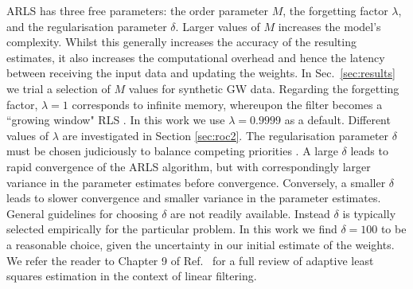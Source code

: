\documentclass[pra,superscriptaddress,reprint,amsmath,amssymb,nofootinbib]{revtex4-2}
\begin{document}
ARLS has three free parameters: the order parameter $M$, the forgetting factor $\lambda$, and the regularisation parameter $\delta$. Larger values of $M$ increases the model's complexity. Whilst this generally increases the accuracy of the resulting estimates, it also increases the computational overhead and hence the latency between receiving the input data and updating the weights. In Sec.~\ref{sec:results} we trial a selection of $M$ values for synthetic GW data. Regarding the forgetting factor,  $\lambda=1$ corresponds to infinite memory, whereupon the filter becomes a ``growing window" RLS \citep{10.5555/547203,10.5555/560138}. In this work we use $\lambda=0.9999$ as a default. Different values of $\lambda$ are investigated in Section \ref{sec:roc2}. The regularisation parameter $\delta$ must be chosen judiciously to balance competing priorities  \citep{ljung1999system,1989system}. A large $\delta$ leads to rapid convergence of the ARLS algorithm, but with correspondingly larger variance in the parameter estimates before convergence. Conversely, a smaller $\delta$ leads to slower convergence and smaller variance in the parameter estimates. General guidelines for choosing $\delta$ are not readily available. Instead $\delta$ is typically selected empirically for the particular problem. In this work we find $\delta = 100$ to be a reasonable choice, given the uncertainty in our initial estimate of the weights. We refer the reader to Chapter 9 of Ref.~\cite{HaykinAdaptiveFT:2002} for a full review of adaptive least squares estimation in the context of linear filtering. 
\end{document}
